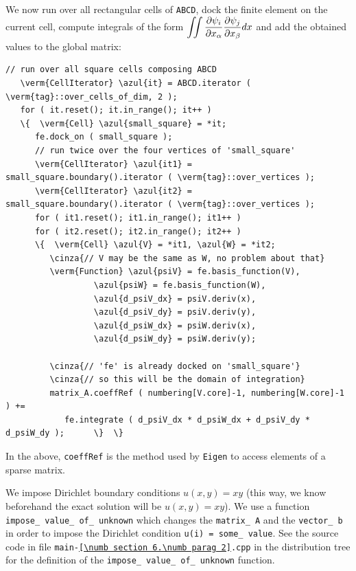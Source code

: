 We now run over all rectangular cells of {\small\tt ABCD}, dock the finite element
on the current cell,
compute integrals of the form $ \displaystyle \int\!\!\!\int {\partial \psi_i \over
\partial x_\alpha} {\partial \psi_j \over \partial x_\beta} dx $ and add the obtained
values to the global matrix:

\begin{Verbatim}[commandchars=\\\{\},formatcom=\small\tt,frame=single,
   label=parag-\ref{\numb section 6.\numb parag 2}.cpp,rulecolor=\color{coment},
   baselinestretch=0.94,framesep=2mm                                            ]
   // run over all square cells composing ABCD
   \verm{CellIterator} \azul{it} = ABCD.iterator ( \verm{tag}::over_cells_of_dim, 2 );
   for ( it.reset(); it.in_range(); it++ )
   \{  \verm{Cell} \azul{small_square} = *it;
      fe.dock_on ( small_square );
      // run twice over the four vertices of 'small_square'
      \verm{CellIterator} \azul{it1} = small_square.boundary().iterator ( \verm{tag}::over_vertices );
      \verm{CellIterator} \azul{it2} = small_square.boundary().iterator ( \verm{tag}::over_vertices );
      for ( it1.reset(); it1.in_range(); it1++ )
      for ( it2.reset(); it2.in_range(); it2++ )
      \{  \verm{Cell} \azul{V} = *it1, \azul{W} = *it2;
         \cinza{// V may be the same as W, no problem about that}
         \verm{Function} \azul{psiV} = fe.basis_function(V),
                  \azul{psiW} = fe.basis_function(W),
                  \azul{d_psiV_dx} = psiV.deriv(x),
                  \azul{d_psiV_dy} = psiV.deriv(y),
                  \azul{d_psiW_dx} = psiW.deriv(x),
                  \azul{d_psiW_dy} = psiW.deriv(y);
                  
         \cinza{// 'fe' is already docked on 'small_square'}
         \cinza{// so this will be the domain of integration}
         matrix_A.coeffRef ( numbering[V.core]-1, numbering[W.core]-1 ) +=
            fe.integrate ( d_psiV_dx * d_psiW_dx + d_psiV_dy * d_psiW_dy );      \}  \}
\end{Verbatim}

In the above, {\small\tt coeffRef} is the method used by {\small\tt Eigen} to access elements of
a sparse matrix.

We impose Dirichlet boundary conditions $ u(x,y) = xy $ (this way, we know beforehand
the exact solution will be $ u(x,y) = xy $).
We use a function {\small\tt impose\_\,value\_\,of\_\,unknown} which changes the {\small\tt matrix\_\,A}
and the {\small\tt vector\_\,b} in order to impose the Dirichlet condition {\small\tt u(i) = 
some\_\,value}.
See the source code in file {\small\tt main-\ref{\numb section 6.\numb parag 2}.cpp}
in the distribution tree for the definition of the {\small\tt impose\_\,value\_\,of\_\,unknown}
function.

